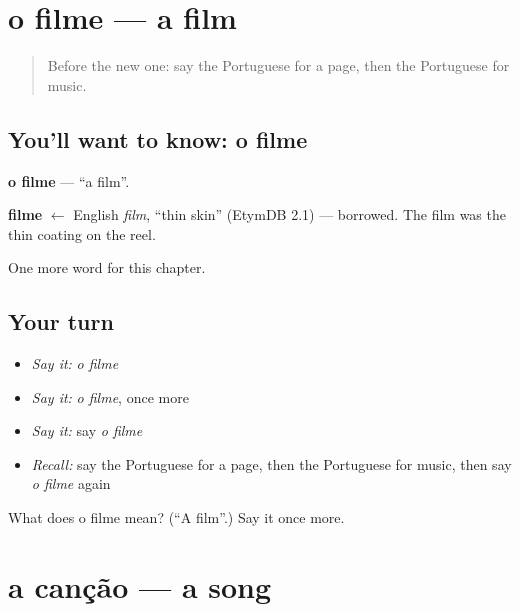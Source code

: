 \section[o filme]{o filme — a film}

\label{lesson:PT-C114-filme}



\begin{quote}
Before the new one: say the Portuguese for a page, then the Portuguese for music.
\end{quote}

\subsection*{You'll want to know: o filme}
\textbf{o filme} — \textquotedblleft{}a film\textquotedblright{}.

\begin{cousinweb}
\textbf{filme} $\leftarrow$ English \emph{film}, \textquotedblleft{}thin skin\textquotedblright{} (EtymDB 2.1) — borrowed. The film was the thin coating on the reel.
\end{cousinweb}

\begin{grammarlens}[title={What you've built}]
One more word for this chapter.
\end{grammarlens}

\subsection*{Your turn}
\begin{itemize}
\raggedright
  \item \emph{Say it:} \emph{o filme}
  \item \emph{Say it:} \emph{o filme}, once more
  \item \emph{Say it:} say \emph{o filme}
  \item \emph{Recall:} say the Portuguese for a page, then the Portuguese for music, then say \emph{o filme} again
\end{itemize}

\begin{tcolorbox}[breakable,colback=teal!4,colframe=teal!35!black,title={Before you move on}]
What does o filme mean? (\textquotedblleft{}A film\textquotedblright{}.) Say it once more.
\end{tcolorbox}
\section[a canção]{a canção — a song}

